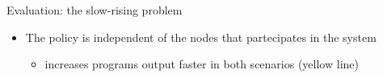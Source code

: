 \documentclass[8pt, aspectratio=169, handout]{beamer}
\begin{document}
\begin{frame}{Evaluation: the slow-rising problem}
\begin{card}[Results]
\begin{itemize}
\begin{itemize}
      \end{itemize}
      \item The policy is independent of the nodes that partecipates in the system
      \begin{itemize}
        \item increases programs output faster in both scenarios (yellow line)
      \end{itemize}
    \end{itemize}
  \end{card}
  \begin{multicols}{3}
  \end{multicols}
\end{frame}
\end{document}
